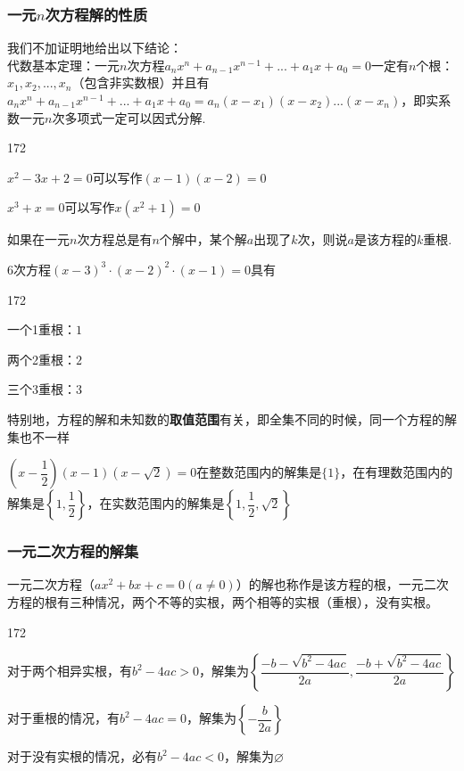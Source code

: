 \subsubsection*{一元$n$次方程解的性质}
我们不加证明地给出以下结论：\\
代数基本定理：一元$n$次方程$a_nx^n + a_{n-1}x^{n-1} + ... + a_1x+a_0 = 0$一定有$n$个根：$x_1, x_2, ..., x_n$（包含非实数根）并且有$a_nx^n + a_{n-1}x^{n-1} + ... + a_1x+a_0 = a_n(x-x_1)(x-x_2) ... (x-x_n)$，即实系数一元$n$次多项式一定可以因式分解.
\begin{example}
    \begin{dingautolist}{172}
        \item $x^2-3x+2 = 0$可以写作$(x-1)(x-2) = 0$
        \item $x^3 + x = 0$可以写作$x(x^2+1) = 0$
    \end{dingautolist}
\end{example}
如果在一元$n$次方程总是有$n$个解中，某个解$a$出现了$k$次，则说$a$是该方程的$k$重根.
\begin{example}
    6次方程$(x-3)^3 \cdot (x-2)^2 \cdot (x-1) = 0$具有
    \begin{dingautolist}{172}
        \item 一个1重根：$1$
        \item 两个2重根：$2$
        \item 三个3重根：$3$
    \end{dingautolist}
\end{example}
特别地，方程的解和未知数的\textbf{取值范围}有关，即全集不同的时候，同一个方程的解集也不一样
\begin{example}
    $\left(x - \dfrac{1}{2}\right)(x-1)(x-\sqrt{2}) = 0$在整数范围内的解集是$\{1\}$，在有理数范围内的解集是$\left\{1, \dfrac{1}{2}\right\}$，在实数范围内的解集是$\left\{1, \dfrac{1}{2}, \sqrt{2}\right\}$
\end{example}

\subsubsection*{一元二次方程的解集}
一元二次方程（$ax^2 + bx + c = 0 (a \neq 0)$）的解也称作是该方程的根，一元二次方程的根有三种情况，两个不等的实根，两个相等的实根（重根），没有实根。
\begin{dingautolist}{172}
    \item 对于两个相异实根，有$b^2 - 4ac > 0$，解集为$\left\{\dfrac{-b - \sqrt{b^2 - 4ac}}{2a}, \dfrac{-b + \sqrt{b^2 - 4ac}}{2a}\right\}$
    \item 对于重根的情况，有$b^2 - 4ac = 0$，解集为$\left\{-\dfrac{b}{2a}\right\}$
    \item 对于没有实根的情况，必有$b^2 - 4ac < 0$，解集为$\varnothing$
\end{dingautolist}
